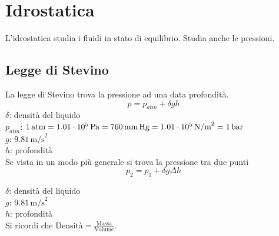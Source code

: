 
\section{Idrostatica}
L'idrostatica studia i fluidi in stato di equilibrio. Studia anche le pressioni.
\subsection{Legge di Stevino}
La legge di Stevino trova la pressione ad una data profondità.
\begin{equation*}
p = p_{atm} + \delta gh
\end{equation*}
$\delta$: densità del liquido\\
\hyperref[tab:patm]{$p_{atm}$}: $1\,\text{atm} = 1.01\cdot10^5\,\text{Pa} = 760\,\text{mm\,Hg} = 
1.01\cdot10^5\,\text{N/m}^2 = 1\,\text{bar}$\\
\hyperref[tab:g]{$g$}: $9.81\,\text{m/s}^2$\\
$h$: profondità\\[\baselineskip]
Se vista in un modo più generale si trova la pressione tra due punti
\begin{equation*}
p_2 = p_1 + \delta g\Delta h
\end{equation*}
\begin{center}
\end{center}

$\delta$: densità del liquido\\
\hyperref[tab:g]{$g$}: $9.81\,\text{m/s}^2$\\
$h$: profondità\\ [\baselineskip]

Si ricordi che $\text{Densità}=\frac{\text{Massa}}{\text{Volume}}$.

